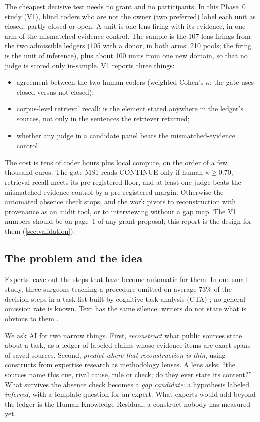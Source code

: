 \evfut{} The cheapest decisive test needs no grant and no participants. In this Phase~0 study (V1),
blind coders who are not the owner (two preferred) label each unit as closed, partly closed or open. A unit is one
lens firing with its evidence, in one arm of the mismatched-evidence control. The sample is the 107 lens firings from the two admissible ledgers (105 with a donor, in both arms: 210 pools; the firing is the unit of inference), plus about 100 units from one new
domain, so that no judge is scored only in-sample. V1 reports three things:
\begin{itemize}[nosep]
  \item agreement between the two human coders (weighted Cohen's $\kappa$; the gate uses closed
    versus not closed);
  \item corpus-level retrieval recall: is the element stated anywhere in the ledger's sources, not
    only in the sentences the retriever returned;
  \item whether any judge in a candidate panel beats the mismatched-evidence control.
\end{itemize}
The cost is tens of coder hours plus local compute, on the order of a few thousand euros. The gate
MS1 reads CONTINUE only if human $\kappa \geq 0.70$, retrieval recall meets its pre-registered floor,
and at least one judge beats the mismatched-evidence control by a pre-registered margin. Otherwise the automated
absence check stops, and the work pivots to reconstruction with provenance as an audit tool, or to
interviewing without a gap map. The V1 numbers should be on page~1 of any grant proposal; this report
is the design for them (\cref{sec:validation}).

\subsection*{The problem and the idea}

Experts leave out the steps that have become automatic for them. In one small study, three
surgeons teaching a procedure omitted on average 73\% of the decision steps in a task list built by
cognitive task analysis (CTA) \parencite{sullivan2014use}; no general omission rate is known. Text
has the same silence: writers do not state what is obvious to them \parencite{gordon2013reporting}.

We ask AI for two narrow things. First, \emph{reconstruct} what public sources state about a task,
as a ledger of labeled claims whose evidence items are exact spans of saved sources. Second,
\emph{predict where that reconstruction is thin}, using constructs from expertise research as
methodology lenses. A lens asks: \enquote{the sources name this cue, rival cause, rule or check; do
they ever state its content?} What survives the absence check becomes a \emph{gap candidate}: a
hypothesis labeled \emph{inferred}, with a template question for an expert. What experts would add beyond the ledger is
the Human Knowledge Residual, a construct nobody has measured yet.

